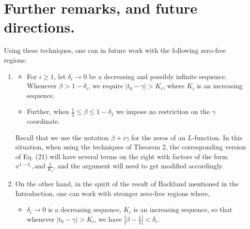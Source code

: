 \documentclass[letter,12pt]{article}
\theoremstyle{plain}
\theoremstyle{definition}
\theoremstyle{plain}
\begin{document}
\section{Further remarks, and future directions.} 
Using these techniques, one can in future work with the following zero-free regions:
\begin{enumerate}
\item \begin{itemize}
\item For $i\geq 1$, let $\delta_i\to 0$  be a decreasing  and possibly infinite sequence. Whenever $\beta>1-\delta_i$, we require $|t_0 -\gamma|>K_i$, where $K_i$ is an increasing sequence. 
\item Further, when $\frac{1}{2} \leq \beta\leq 1-\delta_1$ we impose no restriction on the $\gamma$ coordinate.
\end{itemize}
\bigskip
Recall that we use the notation $\beta +i\gamma$ for the zeros of an $L$-function. In this situation, when using the techniques of Theorem 2, the corresponding version of Eq. (21) will have several terms on the right with factors of the form $x^{1-\delta_i},\text{and} \ \frac{1}{K_i}$, and the argument will need to get modified accordingly. 

\item On the other hand, in the spirit of the result of Backlund mentioned in the Introduction, one can work with stronger zero-free regions where, 
\begin{itemize}
    \item $\delta_i\to 0$ is a decreasing sequence, $K_i$ is an increasing sequence, so that whenever $|t_0 -\gamma|>K_i$, we have $|\beta -\frac{1}{2}|<\delta_i$.
\end{itemize}
\end{enumerate}
\bigskip






\bigskip
\end{document}
